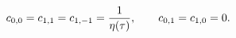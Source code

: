 \begin{equation}
  c_{0,0}= c_{1,1} = c_{1,-1}= {1\over\eta(\tau)}, \qquad c_{0,1}= c_{1,0}= 0.
\end{equation}

